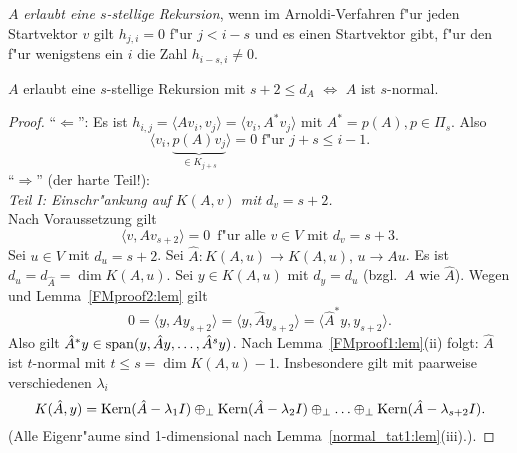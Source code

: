 \begin{defn} $A$ {\em erlaubt eine $s$-stellige Rekursion}, wenn im
Arnoldi-Verfahren f"ur jeden Startvektor $v$ gilt $h_{j,i} = 0$ f"ur
$j < i-s$ und es einen Startvektor gibt, f"ur den f"ur wenigstens
ein $i$ die Zahl $h_{i-s,i} \neq 0$. 
\end{defn}


\begin{sa} 
\label{faber:sa}
$A$ erlaubt eine $s$-stellige Rekursion mit $s+2 \leq d_A$
 $\Longleftrightarrow$ $A$ ist $s$-normal. 
\end{sa}
\begin{proof}
"`$\Leftarrow$"': Es ist $h_{i,j} = \langle Av_i,v_j \rangle = \langle v_i, A^*v_j \rangle$
mit $A^* = p(A), p \in \Pi_s$. Also
\[
\langle v_i, \underbrace{p(A)v_j}_{\in K_{j+s}} \rangle = 0 \mbox{ f"ur } j+s \leq i-1.
\]
"`$\Rightarrow$"' (der harte Teil!): \\
{\em Teil I: Einschr"ankung auf $K(A,v)$ mit $d_v = s+2$.}\\
Nach Voraussetzung gilt
\begin{equation} \label{FMproof:eq}
\langle v, Av_{s+2} \rangle = 0 \enspace \mbox{f"ur alle } v \in V \mbox{ mit } d_v = s+3.
\end{equation}
Sei $u \in V$ mit $d_u = s+2$. Sei $\hat{A}: K(A,u) \to K(A,u), \, u \to Au$. Es
ist $d_u = d_{\hat{A}} = \dim K(A,u)$. Sei $y \in K(A,u)$ mit $d_y = d_u$
(bzgl.\ $A$ wie $\hat{A}$). Wegen  und Lemma~\ref{FMproof2:lem}
gilt
\[
0 = \langle y, Ay_{s+2} \rangle =  \langle y, \hat{A}y_{s+2} \rangle = 
\langle \hat{A}^*y, y_{s+2} \rangle .
\]
Also gilt $\hat{A}^*y \in \operatorname{span}(y,\hat{A}y,\ldots,\hat{A}^s y)$. Nach Lemma~\ref{FMproof1:lem}(ii)
folgt: $\hat{A}$ ist $t$-normal mit $t \leq s = \dim K(A,u) -1$. Insbesondere gilt mit paarweise
verschiedenen $\lambda_i$
\[
  K(\hat{A},y) = \mbox{Kern}(\hat{A}-\lambda_1 I) \oplus_\perp \mbox{Kern}(\hat{A}-\lambda_2 I) \oplus_\perp 
         \ldots \oplus_\perp \mbox{Kern}(\hat{A}-\lambda_{s+2} I).
\]
(Alle Eigenr"aume sind 1-dimensional nach Lemma~\ref{normal_tat1:lem}(iii).).
\smallskip


\end{proof}
